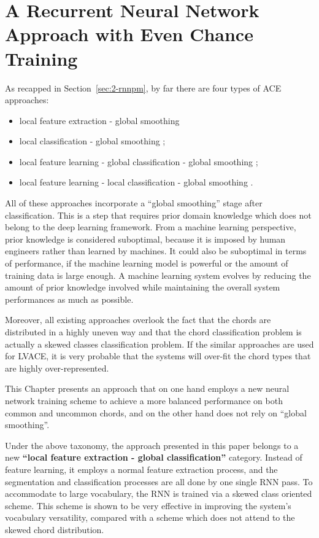 
\chapter{A Recurrent Neural Network Approach with Even Chance Training}\label{cp:endtoend}
\noindent
As recapped in Section~\ref{sec:2-rnnpm}, by far there are four types of ACE approaches:
\begin{itemize}
\item local feature extraction - global smoothing \cite{fujishima1999realtime,sheh2003chord}
\item local classification - global smoothing \cite{humphrey2012rethinking};
\item local feature learning - global classification - global smoothing \cite{boulanger2013audio,sigtia2015audio};
\item local feature learning - local classification - global smoothing \cite{zhou2015chord}.
\end{itemize}
All of these approaches incorporate a ``global smoothing'' stage after classification. This is a step that requires prior domain knowledge which does not belong to the deep learning framework. From a machine learning perspective, prior knowledge is considered suboptimal, because it is imposed by human engineers rather than learned by machines. It could also be suboptimal in terms of performance, if the machine learning model is powerful or the amount of training data is large enough. A machine learning system evolves by reducing the amount of prior knowledge involved while maintaining the overall system performances as much as possible.

Moreover, all existing approaches overlook the fact that the chords are distributed in a highly uneven way and that the chord classification problem is actually a skewed classes classification problem. If the similar approaches are used for LVACE, it is very probable that the systems will over-fit the chord types that are highly over-represented.

This Chapter presents an approach that on one hand employs a new neural network training scheme to achieve a more balanced performance on both common and uncommon chords, and on the other hand does not rely on ``global smoothing''.

Under the above taxonomy, the approach presented in this paper belongs to a new \textbf{``local feature extraction - global classification''} category. Instead of feature learning, it employs a normal feature extraction process, and the segmentation and classification processes are all done by one single RNN pass. To accommodate to large vocabulary, the RNN is trained via a skewed class oriented scheme. This scheme is shown to be very effective in improving the system's vocabulary versatility, compared with a scheme which does not attend to the skewed chord distribution.


